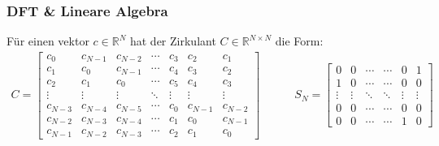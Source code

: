 \newpage
\subsubsection{DFT \& Lineare Algebra}

\setcounter{all}{25}
 Für einen vektor $c \in \mathbb{R}^N$ hat der Zirkulant $C \in \mathbb{R}^{N \times N}$ die Form:
\begin{align*}
    C = \begin{bmatrix}
        c_0 & c_{N-1} & c_{N-2} & \cdots & c_3 & c_2 & c_1 \\
        c_1 & c_0     & c_{N-1} & \cdots & c_4 & c_3 & c_2 \\
        c_2 & c_1     & c_{0}   & \cdots & c_5 & c_4 & c_3 \\
        \vdots & \vdots & \vdots & \ddots & \vdots & \vdots & \vdots \\
        c_{N-3} & c_{N-4} & c_{N-5} & \cdots & c_0 & c_{N-1} & c_{N-2} \\
        c_{N-2} & c_{N-3} & c_{N-4} & \cdots & c_{1} & c_0 & c_{N-1} \\
        c_{N-1} & c_{N-2} & c_{N-3} & \cdots & c_{2} & c_1 & c_0
    \end{bmatrix}
    \quad \quad \quad 
    S_N = \begin{bmatrix}
        0 & 0 & \cdots & \cdots & 0 & 1 \\
        1 & 0 & \cdots & \cdots & 0 & 0 \\
        \vdots & \vdots & \ddots & \ddots & \vdots & \vdots \\
        0 & 0 & \cdots & \cdots & 0 & 0 \\
        0 & 0 & \cdots & \cdots & 1 & 0 
    \end{bmatrix}
\end{align*}

